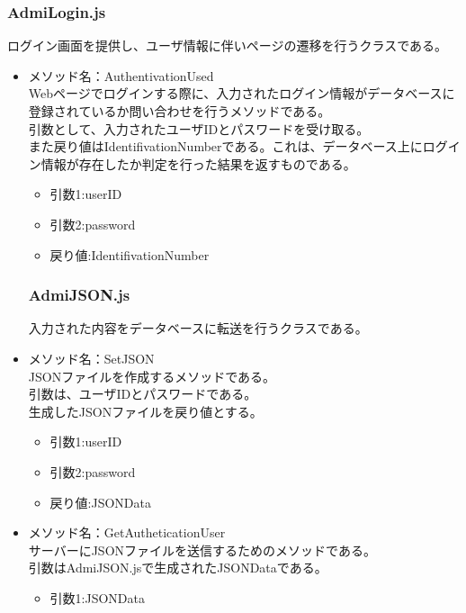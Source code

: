 \documentclass[a4j]{jarticle}
\begin{document}
\subsubsection{AdmiLogin.js}
ログイン画面を提供し、ユーザ情報に伴いページの遷移を行うクラスである。
\begin{itemize}

\item メソッド名：AuthentivationUsed\\

Webページでログインする際に、入力されたログイン情報がデータベースに登録されているか問い合わせを行うメソッドである。\\
引数として、入力されたユーザIDとパスワードを受け取る。\\
また戻り値はIdentifivationNumberである。これは、データベース上にログイン情報が存在したか判定を行った結果を返すものである。\\

	\begin{itemize}
		\item 引数1:userID
		\item 引数2:password
		\item 戻り値:IdentifivationNumber
	\end{itemize}
	\subsubsection{AdmiJSON.js}
入力された内容をデータベースに転送を行うクラスである。
\item メソッド名：SetJSON\\

JSONファイルを作成するメソッドである。\\引数は、ユーザIDとパスワードである。\\生成したJSONファイルを戻り値とする。
	\begin{itemize}
		\item 引数1:userID
		\item 引数2:password
		\item 戻り値:JSONData
	\end{itemize}
\item メソッド名：GetAutheticationUser\\

サーバーにJSONファイルを送信するためのメソッドである。\\
引数はAdmiJSON.jsで生成されたJSONDataである。
	\begin{itemize}
		\item 引数1:JSONData
	\end{itemize}


\end{itemize}
\end{document}
